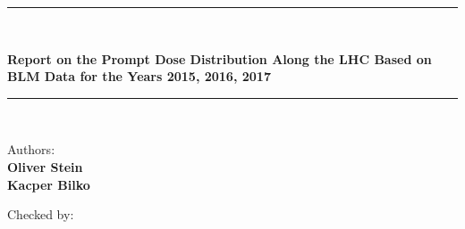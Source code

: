 \begin{titlepage}

\newcommand{\HRule}{\rule{\linewidth}{0.5mm}} %

\center %
 


\renewcommand{\baselinestretch}{1}
\HRule \\[0.4cm]
{ \huge \bfseries Report on the Prompt Dose Distribution Along the LHC Based on BLM Data for the Years 2015, 2016, 2017\par} %
\vspace{0.4cm}
\HRule \\[0.5cm]
 
 
\vspace{1.5cm} 
{ \Large  Authors:\\
\vspace{0.4cm}
\bfseries Oliver Stein\\
\bfseries Kacper Bilko\\
\par}
\vspace{1.5cm} 
{ \Large  Checked by:\\
\vspace{0.4cm}

}
\end{titlepage}
